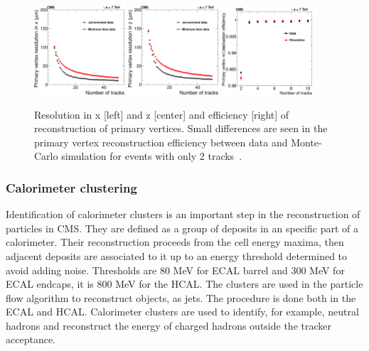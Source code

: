 \begin{figure}[!Hhtbp]
  \begin{center}
    \includegraphics[width=0.3\textwidth]{figs/PrimaryVertexResolutionX.png}
    \includegraphics[width=0.3\textwidth]{figs/PrimaryVertexResolutionZ.png}
    \includegraphics[width=0.3\textwidth]{figs/PrimaryVertexTagAndProbeEfficiency.png}
    \caption{Resolution in x [left] and z [center] and efficiency [right] of reconstruction of primary vertices. Small differences are seen in the primary vertex reconstruction efficiency between data and Monte-Carlo simulation for events with only 2 tracks~\cite{Chatrchyan:2014fea}.}
    \label{fig:VertexRec}
  \end{center}
\end{figure}

\subsubsection{Calorimeter clustering}

Identification of calorimeter clusters is an important step in the reconstruction of particles in CMS. They are defined as a group of deposits in an specific part of a calorimeter. Their reconstruction proceeds from the cell energy maxima, then adjacent deposits are associated to it up to an energy threshold determined to avoid adding noise. Thresholds are 80 MeV for ECAL barrel and 300 MeV for ECAL endcaps, it is 800 MeV for the HCAL. The clusters are used in the particle flow algorithm to reconstruct objects, as jets. The procedure is done both in the ECAL and HCAL. Calorimeter clusters are used to identify, for example, neutral hadrons and reconstruct the energy of charged hadrons outside the tracker acceptance.    

